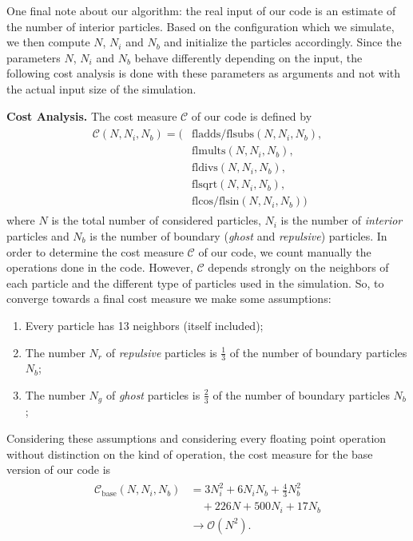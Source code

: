 \documentclass[letterpaper]{article}
\newcommand{\mypar}[1]{{\bf #1.}}
\begin{document}
One final note about our algorithm: the real input of our code is an estimate of the number of interior particles. Based on the configuration which we simulate, we then compute $N$, $N_i$ and $N_b$ and initialize the particles accordingly. Since the parameters $N$, $N_i$ and $N_b$ behave differently depending on the input, the following cost analysis is done with these parameters as arguments and not with the actual input size of the simulation.

\mypar{Cost Analysis}
The cost measure $\mathcal{C}$ of our code is defined by 
\begin{align}\label{eq-4}
\begin{split}
\mathcal{C}(N, N_i, N_b) = (  &\text{fladds/flsubs}(N, N_i, N_b), \\
                    &\text{flmults}(N, N_i, N_b), \\
                    &\text{fldivs}(N, N_i, N_b), \\
                    &\text{flsqrt}(N, N_i, N_b), \\
                    &\text{flcos/flsin}(N, N_i, N_b))
\end{split}
\end{align}
where $N$ is the total number of considered particles, $N_i$ is the number of \emph{interior} particles and $N_b$ is the number of boundary (\emph{ghost} and \emph{repulsive}) particles. In order to determine the cost measure $\mathcal{C}$ of our code, we count manually the operations done in the code. However, $\mathcal{C}$ depends strongly on the neighbors of each particle and the different type of particles used in the simulation. So, to converge towards a final cost measure we make some assumptions:
\begin{enumerate}[noitemsep]
    \item Every particle has 13 neighbors (itself included);
    \item The number $N_r$ of \emph{repulsive} particles is $\frac{1}{3}$ of the number of boundary particles $N_b$;
    \item The number $N_g$ of \emph{ghost} particles is $\frac{2}{3}$ of the number of boundary particles $N_b$;
\end{enumerate}
Considering these assumptions and considering every floating point operation without distinction on the kind of operation, the cost measure for the base version of our code is 
\begin{align} \label{eq-5}
    \begin{split}
        \mathcal{C}_{\text{base}}(N, N_i, N_b) &= 3N_i^2 + 6N_i N_b + \frac{4}{3}N_b^2 \\
        & \quad+226N + 500N_i + 17N_b \\
        &\rightarrow \mathcal{O}(N^2).
    \end{split}
\end{align}
\end{document}
